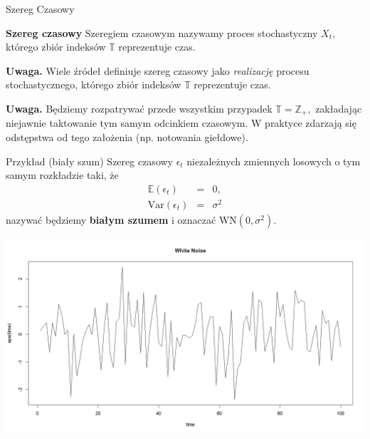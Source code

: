 \documentclass[a4paper, 11pt]{beamer}
\begin{document}
	\begin{frame}{Szereg Czasowy}
		\begin{block}{\textbf{Szereg czasowy}}
			Szeregiem czasowym nazywamy proces stochastyczny $X_t,$ którego zbiór indeksów $\mathbb{T}$ reprezentuje czas.
		\end{block}
		
		\begin{alert}{\textbf{Uwaga.}}
			Wiele źródeł definiuje szereg czasowy jako \textit{realizację} procesu stochastycznego, którego zbiór indeksów $\mathbb{T}$ reprezentuje czas.
		\end{alert}
		
		\begin{alert}{\textbf{Uwaga.}}
			Będziemy rozpatrywać przede wszystkim przypadek $\mathbb{T} = \mathbb{Z}_+,$ zakładając niejawnie taktowanie tym samym odcinkiem czasowym.
			W praktyce zdarzają się odstępstwa od tego założenia (np. notowania giełdowe).
		\end{alert}
		
	\end{frame}
	
	\begin{frame}{Przykład (biały szum)}
		Szereg czasowy $\epsilon_t$ niezależnych zmiennych losowych o tym samym rozkładzie taki, że \begin{eqnarray*}
			\mathbb{E}\left(\epsilon_t\right) & = & 0,\\
			\mbox{Var}\left(\epsilon_t\right) & = & \sigma^2
		\end{eqnarray*} nazywać będziemy \textbf{białym szumem} i oznaczać $\mbox{WN}\left(0, \sigma^2\right)$.
		
		\begin{center}
			\includegraphics[scale=0.25]{./gfx/white_noise}
		\end{center}
	\end{frame}
\end{document}
